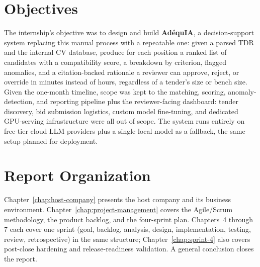 \section{Objectives}

The internship's objective was to design and build \textbf{AdéquIA}, a
decision-support system replacing this manual process with a repeatable one:
given a parsed TDR and the internal CV database, produce for each position a
ranked list of candidates with a compatibility score, a breakdown by
criterion, flagged anomalies, and a citation-backed rationale a reviewer can
approve, reject, or override in minutes instead of hours, regardless of a
tender's size or bench size. Given the one-month timeline, scope was kept to
the matching, scoring, anomaly-detection, and reporting pipeline plus the
reviewer-facing dashboard: tender discovery, bid submission logistics,
custom model fine-tuning, and dedicated GPU-serving infrastructure were all
out of scope. The system runs entirely on free-tier cloud LLM providers plus
a single local model as a fallback, the same setup planned for deployment.

\section{Report Organization}

Chapter~\ref{chap:host-company} presents the host company and its business
environment. Chapter~\ref{chap:project-management} covers the Agile/Scrum
methodology, the product backlog, and the four-sprint plan. Chapters~4
through 7 each cover one sprint (goal, backlog, analysis, design,
implementation, testing, review, retrospective) in the same structure;
Chapter~\ref{chap:sprint-4} also covers post-close hardening and
release-readiness validation. A general conclusion closes the report.

